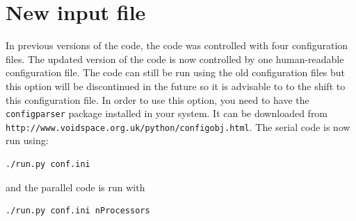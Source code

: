 \documentclass[12pt]{article}
\begin{document}
\section{New input file}
In previous versions of the code, the code was controlled with four configuration files. The updated
version of the code is now controlled by one human-readable configuration file. The code can still be
run using the old configuration files but this option will be discontinued in the future so it is 
advisable to to the shift to this configuration file. In order to use this option, you need
to have the \texttt{configparser} package installed in your system. It can be downloaded from 
\texttt{http://www.voidspace.org.uk/python/configobj.html}.
The serial code is now run using:
\begin{verbatim}
./run.py conf.ini
\end{verbatim}
and the parallel code is run with
\begin{verbatim}
./run.py conf.ini nProcessors
\end{verbatim}
\end{document}
